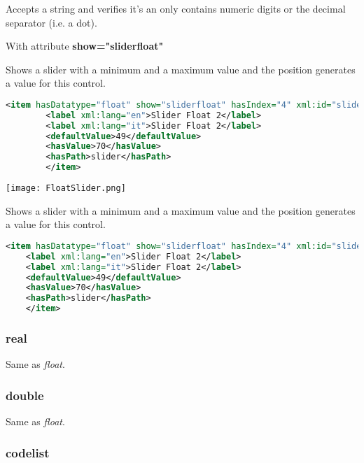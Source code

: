 Accepts a string and verifies it's an only contains numeric digits or the decimal separator (i.e. a dot).

\begin{mdframed}
	With attribute \textbf{show="sliderfloat"}
	
	Shows a slider with a minimum and a maximum value and the position generates a value for this control.
	
	\begin{lstlisting}[language=xml]
		<item hasDatatype="float" show="sliderfloat" hasIndex="4" xml:id="slider2" isFixed="false" min="0.0" max="100.00" step="0.5">
		<label xml:lang="en">Slider Float 2</label>
		<label xml:lang="it">Slider Float 2</label>
		<defaultValue>49</defaultValue>
		<hasValue>70</hasValue>
		<hasPath>slider</hasPath>
		</item>
	\end{lstlisting}
	
	
	{\centering
		\texttt{[image: FloatSlider.png]}
		\par
	}
	
	
\end{mdframed}


Shows a slider with a minimum and a maximum value and the position generates a value for this control.

\begin{lstlisting}[language=xml]
	<item hasDatatype="float" show="sliderfloat" hasIndex="4" xml:id="slider2" isFixed="false" min="0.0" max="100.00" step="0.5">
	<label xml:lang="en">Slider Float 2</label>
	<label xml:lang="it">Slider Float 2</label>
	<defaultValue>49</defaultValue>
	<hasValue>70</hasValue>
	<hasPath>slider</hasPath>
	</item>
\end{lstlisting}


\subsubsection{real}
\label{double}

Same as \textit{float}.

\subsubsection{double}
\label{double}

Same as \textit{float}.


\subsubsection{codelist}
\label{codelist}

